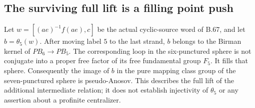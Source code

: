 \subsection*{The surviving full lift is a filling point push}

Let $w=[(ae)^{-1}f(ae),c]$ be the actual cyclic-source word
of B.67, and let $b=\theta_5(w)$.
After moving label $5$ to the last strand, $b$ belongs to
the Birman kernel of $PB_6\to PB_5$.
The corresponding loop in the six-punctured sphere is
not conjugate into a proper free factor of its free
fundamental group $F_5$.  It fills that sphere.
Consequently the image of $b$ in the pure mapping class
group of the seven-punctured sphere is pseudo-Anosov.
This describes the full lift of the additional intermediate
relation; it does not establish injectivity of $\theta_5$
or any assertion about a profinite centralizer.


